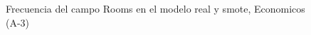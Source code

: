\begin{figure}[H]
    \centering
    
    \caption{Frecuencia del campo Rooms en el modelo real y smote, Economicos (A-3)}
    \label{frecuency-Rooms-smote-enc}
\end{figure}